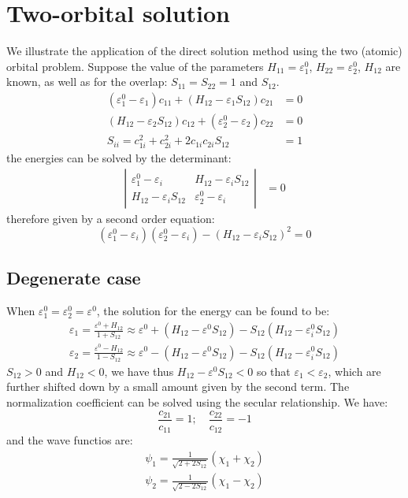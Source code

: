 \documentclass{article}
\begin{document}
\section{Two-orbital solution}
We illustrate the application of the direct solution method using the two (atomic) orbital problem. Suppose the 
value of the parameters $H_{11} = \varepsilon_1^0$, $H_{22} = \varepsilon_2^0$, $H_{12}$ are known, as well as 
for the overlap: $S_{11} = S_{22} = 1$ and $S_{12}$. 
\begin{align}
    (\varepsilon_1^0 - \varepsilon_1) c_{11} + (H_{12} - \varepsilon_1 S_{12}) c_{21} &= 0 \\
    (H_{12} - \varepsilon_2 S_{12}) c_{12} + (\varepsilon_2^0 - \varepsilon_2) c_{22} &= 0 \\ 
    S_{ii} = c_{1i}^2 + c_{2i}^2 + 2 c_{1i} c_{2i} S_{12} &= 1
\end{align}
the energies can be solved by the determinant:
\begin{align}
    \left| \begin{matrix}
        \varepsilon_1^0 - \varepsilon_i & H_{12} - \varepsilon_i S_{12} \\
        H_{12} - \varepsilon_i S_{12} & \varepsilon_2^0 - \varepsilon_i
    \end{matrix} \right| &= 0 
\end{align}
therefore given by a second order equation:
\begin{equation}
    (\varepsilon_1^0 - \varepsilon_i)(\varepsilon_2^0 - \varepsilon_i) - (H_{12} - \varepsilon_i S_{12})^2 = 0
\end{equation}

\subsection{Degenerate case}
When $\varepsilon_1^0 = \varepsilon_2^0 = \varepsilon^0$, the solution for the energy can be found to be:
\begin{align}
    \varepsilon_1 = \frac{\varepsilon^0 + H_{12}}{1 + S_{12}} \approx \varepsilon^0 + (H_{12} - \varepsilon^0 S_{12}) - S_{12} (H_{12} - \varepsilon_i^0 S_{12}) \\
    \varepsilon_2 = \frac{\varepsilon^0 - H_{12}}{1 - S_{12}} \approx \varepsilon^0 - (H_{12} - \varepsilon^0 S_{12}) - S_{12} (H_{12} - \varepsilon_i^0 S_{12}) 
\end{align}
$S_{12} > 0$ and $H_{12} < 0$, we have thus $H_{12} - \varepsilon^0 S_{12} < 0$ so that $\varepsilon_1 < \varepsilon_2$, which are further shifted down by a small amount 
given by the second term.
The normalization coefficient can be solved using the secular relationship. We have:
\begin{equation}
    \frac{c_{21}}{c_{11}} = 1; \quad \frac{c_{22}}{c_{12}} = -1
\end{equation}
and the wave functios are:
\begin{align}
    \psi_1 = \frac{1}{\sqrt{2 + 2 S_{12}}} (\chi_1 + \chi_2) \\
    \psi_2 = \frac{1}{\sqrt{2 - 2 S_{12}}} (\chi_1 - \chi_2)
\end{align}
\end{document}
